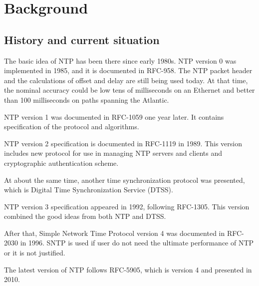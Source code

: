 \chapter{Background}

\section{History and current situation}%
\label{sec:history_and_current_situation}
The basic idea of NTP has been there since early 1980s. NTP version 0 was
implemented in 1985, and it is documented in RFC-958. 
The NTP packet header and the calculations of offset and delay are still being
used today. At that time, the nominal accuracy could be low tens of
milliseconds on an Ethernet and better than 100 milliseconds on paths spanning
the Atlantic.

NTP version 1 was documented in RFC-1059 one year later. It contains
specification of the protocol and algorithms.

NTP version 2 specification is documented in RFC-1119 in 1989. This version
includes new protocol for use in managing NTP servers and clients and
cryptographic authentication scheme.

At about the same time, another time synchronization protocol was presented,
which is Digital Time Synchronization Service (DTSS).

NTP version 3 specification appeared in 1992, following RFC-1305. This version
combined the good ideas from both NTP and DTSS.

After that, Simple Network Time Protocol version 4 was documented in RFC-2030
in 1996. SNTP is used if user do not need the ultimate performance of NTP or
it is not justified.

The latest version of NTP follows RFC-5905, which is version 4 and presented in
2010.

